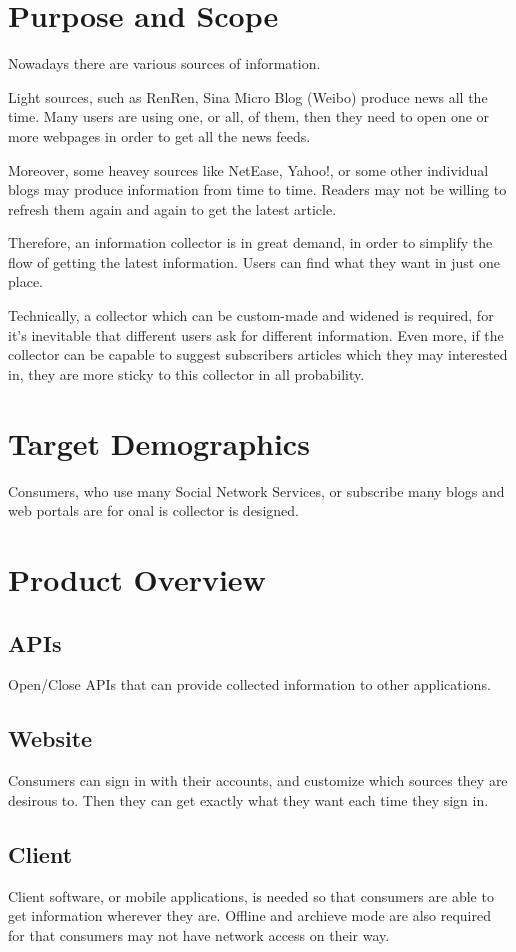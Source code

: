 \section{Purpose and Scope}
  Nowadays there are various sources of information.

  Light sources, such as RenRen, Sina Micro Blog (Weibo) produce news all the time.
  Many users are using one, or all, of them, then they need to open one or more webpages in order to get all the news feeds.

  Moreover, some heavey sources like NetEase, Yahoo!, or some other individual blogs may produce information from time to time.
  Readers may not be willing to refresh them again and again to get the latest article.

  Therefore, an information collector is in great demand, in order to simplify the flow of getting the latest information.
  Users can find what they want in just one place.

  Technically, a collector which can be custom-made and widened is required, for it's inevitable that different users ask for different information.
  Even more, if the collector can be capable to suggest subscribers articles which they may interested in, they are more sticky to this collector in all probability.

\section{Target Demographics}
  Consumers, who use many Social Network Services, or subscribe many blogs and web portals are for onal is collector is designed.

\section{Product Overview}
  \subsection{APIs}
    Open/Close APIs that can provide collected information to other applications.
  \subsection{Website}
    Consumers can sign in with their accounts, and customize which sources they are desirous to.
    Then they can get exactly what they want each time they sign in.
  \subsection{Client}
    Client software, or mobile applications, is needed so that consumers are able to get information wherever they are.
    Offline and archieve mode are also required for that consumers may not have network access on their way.

